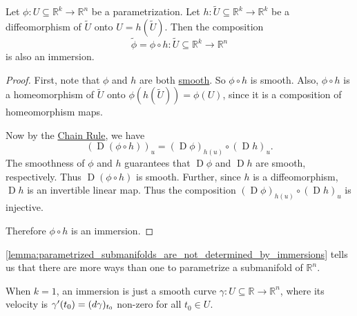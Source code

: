 \documentclass[notoc,notitlepage]{tufte-book}
\DeclareMathOperator{\D}{D}
\begin{document}
\begin{lemma}\label{lemma:parametrized_submanifolds_are_not_determined_by_immersions}
  Let $\phi : U \subseteq \mathbb{R}^k \to \mathbb{R}^n$ be a parametrization.
  Let $h : \tilde{U} \subseteq \mathbb{R}^k \to \mathbb{R}^k$ be a
  diffeomorphism of $\tilde{U}$ onto $U = h(\tilde{U})$. Then the composition
  \begin{equation*}
    \tilde{\phi} = \phi \circ h : \tilde{U} \subseteq \mathbb{R}^k \to
    \mathbb{R}^n
  \end{equation*}
  is also an immersion.
\end{lemma}

\begin{proof}
  First, note that $\phi$ and $h$ are both
  \hyperref[defn:smoothness]{smooth}. So $\phi \circ h$ is smooth.
  Also, $\phi \circ h$ is a homeomorphism of $\tilde{U}$ onto
  $\phi(h(\tilde{U})) = \phi(U)$, since it is a composition of homeomorphism
  maps.

  Now by the \hyperref[thm:the_chain_rule]{Chain Rule}, we have
  \begin{equation*}
    (\D ( \phi \circ h ))_u = (\D \phi)_{h(u)} \circ (\D h)_{u}.
  \end{equation*}
  The smoothness of $\phi$ and $h$ guarantees that $\D \phi$ and $\D h$ are
  smooth, respectively. Thus $\D ( \phi \circ h )$ is smooth. Further, since $h$
  is a diffeomorphism, $\D h$ is an invertible linear map. Thus the composition
  $(\D \phi)_{h(u)} \circ (\D h)_u$ is injective.

  Therefore $\phi \circ h$ is an immersion.
\end{proof}

\begin{note}
  \cref{lemma:parametrized_submanifolds_are_not_determined_by_immersions} tells
  us that there are more ways than one to parametrize a submanifold of
  $\mathbb{R}^n$.
\end{note}

\begin{note}
  When $k = 1$, an immersion is just a smooth curve $\gamma : U \subseteq
  \mathbb{R} \to \mathbb{R}^n$, where its velocity is $\gamma' (t_0) =
  (\mathop{}\!d{\gamma})_{t_0}$ non-zero for all $t_0 \in U$.
\end{note}
\end{document}
